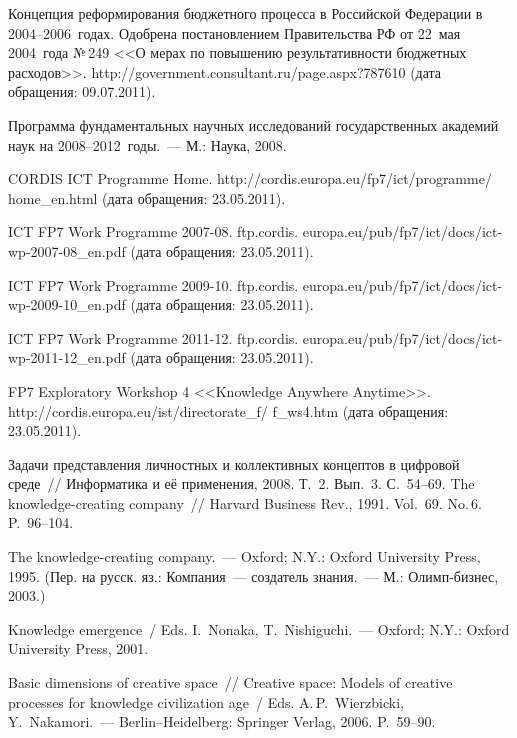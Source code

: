 \begin{multicols}{2}
{\small\frenchspacing
{ %
\begin{thebibliography}{99}

Концепция реформирования бюджетного процесса в Российской Федерации в 2004--2006~годах. 
Одобрена постановлением Правительства РФ от 22~мая 2004~года №\,249 <<О мерах по повышению 
результативности бюджетных расходов>>. {\sf http://government.consultant.ru/page.aspx?787610} (дата 
обращения: 09.07.2011).

Программа фундаментальных научных исследований государственных академий наук на 
2008--2012~годы.~--- М.: Наука, 2008.

CORDIS ICT Programme Home. {\sf http://cordis.\linebreak europa.eu/fp7/ict/programme/ home\_en.html} (дата 
обращения: 23.05.2011).

ICT FP7 Work Programme 2007-08. {\sf ftp.cordis. europa.eu/pub/fp7/ict/docs/ict-wp-2007-08\_en.pdf} (дата 
обращения: 23.05.2011).

ICT FP7 Work Programme 2009-10. {\sf ftp.cordis. europa.eu/pub/fp7/ict/docs/ict-wp-2009-10\_en.pdf} (дата 
обращения: 23.05.2011).

ICT FP7 Work Programme 2011-12. {\sf ftp.cordis. europa.eu/pub/fp7/ict/docs/ict-wp-2011-12\_en.pdf} 
(дата обращения: 23.05.2011).

FP7 Exploratory Workshop 4 <<Knowledge Anywhere Anytime>>. 
{\sf http://cordis.europa.eu/ist/directorate\_f/ f\_ws4.htm} (дата обращения: 23.05.2011).

Задачи представления личностных и коллективных концептов в цифровой среде~// Информатика и её 
применения, 2008. Т.~2. Вып.~3. С.~54--69.
The knowledge-creating company~// Harvard Business Rev., 1991. Vol.~69. No.\,6. P.~96--104.

The knowledge-creating company.~--- Oxford; N.Y.: Oxford University Press, 1995. 
(Пер. на русск. яз.:  Компания~--- создатель знания.~--- М.: Олимп-бизнес, 2003.)

Knowledge emergence~/ Eds. I.~Nonaka, T.~Nishiguchi.~--- Oxford; N.Y.: Oxford University Press, 2001.

Basic dimensions of creative space~// Creative space: Models of creative processes for knowledge 
civilization age~/ Eds. A.\,P.~Wierzbicki,  Y.~Nakamori.~--- Berlin--Heidelberg: Springer Verlag, 2006. 
P.~59--90.


\end{thebibliography}}}
\end{multicols}
